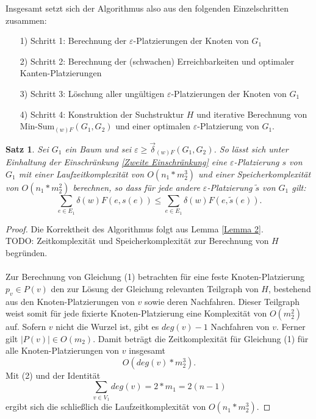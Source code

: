 \documentclass[a4paper, 12pt, twoside]{article}
\theoremstyle{Format1} %
\newtheorem{Satz}[Def]{Satz}                %
\begin{document}
Insgesamt setzt sich der Algorithmus also aus den folgenden Einzelschritten zusammen:
\begin{enumerate}
	\item[1)] Schritt 1: Berechnung der $\varepsilon$-Platzierungen der Knoten von $G_1$
	\item[2)] Schritt 2: Berechnung der (schwachen) Erreichbarkeiten und optimaler Kanten-Platzierungen
	\item[3)] Schritt 3: Löschung aller ungültigen $\varepsilon$-Platzierungen der Knoten von $G_1$
	\item[4)] Schritt 4: Konstruktion der Suchstruktur $H$ und iterative Berechnung von Min-Sum$_{(w)F}(G_1, G_2)$ und einer optimalen $\varepsilon$-Platzierung von $G_1$.
\end{enumerate}

\begin{Satz}
	Sei $G_1$ ein Baum und sei $\varepsilon \geq \vec{\delta}_{(w)F}(G_1,G_2)$.
	So lässt sich unter Einhaltung der Einschränkung \ref{Zweite Einschränkung} eine $\varepsilon$-Platzierung $s$ von $G_1$
	mit einer Laufzeitkomplexität von $O(n_1*m_2^3)$ und einer Speicherkomplexität von $O(n_1*m_2^2)$ berechnen, so dass für jede
	andere $\varepsilon$-Platzierung $\tilde{s}$ von $G_1$ gilt:
	$$\sum_{e \in E_1}\delta{(w)F}(e, s(e)) \leq \sum_{e \in E_1}\delta{(w)F}(e, \tilde{s}(e)).$$
\end{Satz}

\begin{proof}
Die Korrektheit des Algorithmus folgt aus Lemma \ref{Lemma 2}.
\\
TODO: Zeitkomplexität und Speicherkomplexität zur Berechnung von $H$ begründen.
\\
\\
Zur Berechnung von Gleichung (1) betrachten für eine feste Knoten-Platzierung $p_v \in P(v)$ den zur Lösung der Gleichung relevanten Teilgraph von $H$,
bestehend aus den Knoten-Platzierungen von $v$ sowie deren Nachfahren. Dieser Teilgraph weist somit für jede fixierte Knoten-Platzierung eine Komplexität von $O(m_2^2)$ auf.
Sofern $v$ nicht die Wurzel ist, gibt es $deg(v)-1$ Nachfahren von $v$. Ferner gilt $|P(v)| \in O(m_2)$. Damit beträgt die Zeitkomplexität für Gleichung (1) für alle
Knoten-Platzierungen von $v$ insgesamt
\begin{equation}
	O(deg(v)*m_2^3).
\end{equation}
Mit (2) und der Identität
\begin{equation}
	\sum_{v \in V_1} deg(v) = 2*m_1 = 2(n-1)
\end{equation}
ergibt sich die schließlich die Laufzeitkomplexität von $O(n_1*m_2^3).$
\end{proof}
\end{document}
